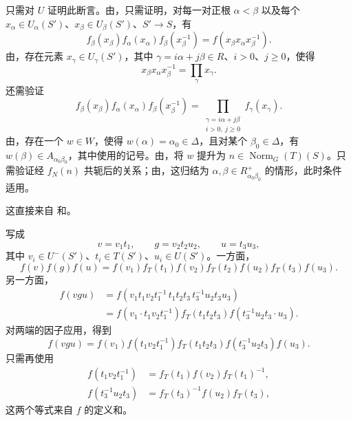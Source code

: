 
只需对 \(U\) 证明此断言。由，只需证明，对每一对正根 \(\alpha<\beta\) 以及每个 \(x_\alpha\in U_\alpha(S')\)、\(x_\beta\in U_\beta(S')\)、\(S'\to S\)，有
\[
  f_\beta(x_\beta)f_\alpha(x_\alpha)f_\beta(x_\beta^{-1})
   =f(x_\beta x_\alpha x_\beta^{-1}).
\]
由，存在元素 \(x_\gamma\in U_\gamma(S')\)，其中 \(\gamma=i\alpha+j\beta\in R\)、\(i>0\)、\(j\geq0\)，使得
\[
  x_\beta x_\alpha x_\beta^{-1}=\prod_\gamma x_\gamma.
\]
还需验证
\[
  f_\beta(x_\beta)f_\alpha(x_\alpha)f_\beta(x_\beta^{-1})
   =
  \prod_{\substack{\gamma=i\alpha+j\beta\\i>0,\ j\geq0}}
  f_\gamma(x_\gamma).
\]
由，存在一个 \(w\in W\)，使得 \(w(\alpha)=\alpha_0\in\Delta\)，且对某个 \(\beta_0\in\Delta\)，有 \(w(\beta)\in A_{\alpha_0\beta_0}\)，其中使用的记号。由，将 \(w\) 提升为 \(n\in\operatorname{Norm}_G(T)(S)\)。只需验证经 \(f_N(n)\) 共轭后的关系；由，这归结为 \(\alpha,\beta\in R^+_{\alpha_0\beta_0}\) 的情形，此时条件 适用。

这直接来自 和。


写成
\[
  v=v_1t_1,\qquad g=v_2t_2u_2,\qquad u=t_3u_3,
\]
其中 \(v_i\in U^-(S')\)、\(t_i\in T(S')\)、\(u_i\in U(S')\)。一方面，
\[
  f(v)f(g)f(u)
  =f(v_1)f_T(t_1)f(v_2)f_T(t_2)f(u_2)f_T(t_3)f(u_3).
\]
另一方面，
\[
\begin{aligned}
 f(vgu)
 &=f(v_1t_1v_2t_1^{-1}\,t_1t_2t_3\,
       t_3^{-1}u_2t_3u_3)\\
 &=f(v_1\cdot t_1v_2t_1^{-1})f_T(t_1t_2t_3)
       f(t_3^{-1}u_2t_3\cdot u_3).
\end{aligned}
\]
对两端的因子应用，得到
\[
 f(vgu)=f(v_1)f(t_1v_2t_1^{-1})f_T(t_1t_2t_3)
   f(t_3^{-1}u_2t_3)f(u_3).
\]
只需再使用
\[
\begin{aligned}
 f(t_1v_2t_1^{-1})&=f_T(t_1)f(v_2)f_T(t_1)^{-1},\\
 f(t_3^{-1}u_2t_3)&=f_T(t_3)^{-1}f(u_2)f_T(t_3),
\end{aligned}
\]
这两个等式来自 \(f\) 的定义和。


